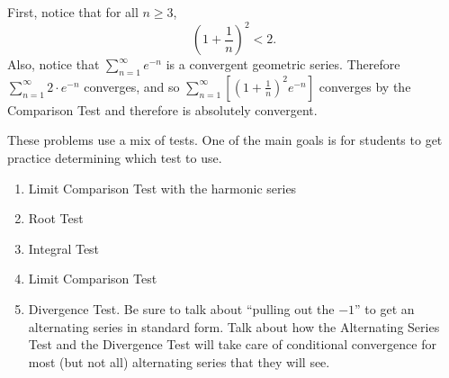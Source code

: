 \documentclass[handout]{ximera}
\begin{document}
\begin{problem}
\begin{freeResponse}
\begin{enumerate}
		First, notice that for all $n \geq 3$,
			\[
			\left( 1 + \frac{1}{n} \right)^2 < 2.
			\]		
		Also, notice that $\sum_{n=1}^\infty e^{-n}$ is a convergent geometric series.  
		Therefore $\sum_{n=1}^\infty 2 \cdot e^{-n}$ converges, and so $\sum_{n=1}^\infty \left[ \left( 1+\frac{1}{n} \right)^2 e^{-n} \right]$ converges by the Comparison Test and therefore is {\color{red}absolutely convergent}.
		
	
	\end{enumerate}
	
	\end{freeResponse}
	
\end{problem}

\begin{instructorNotes}
These problems use a mix of tests.  
One of the main goals is for students to get practice determining which test to use.
	\begin{enumerate}
	\item  Limit Comparison Test with the harmonic series
	\item  Root Test
	\item  Integral Test
	\item  Limit Comparison Test
	\item  Divergence Test.  
	Be sure to talk about ``pulling out the $-1$'' to get an alternating series in standard form.  
	Talk about how the Alternating Series Test and the Divergence Test will take care of conditional convergence for most (but not all) alternating series that they will see.
	\end{enumerate}
\end{instructorNotes}
\end{document}
